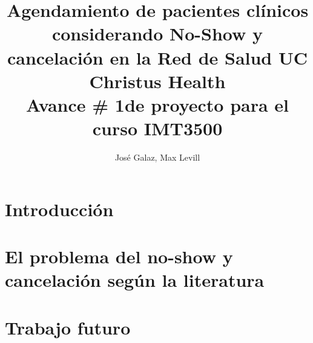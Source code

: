 \documentclass{article}
\title{Agendamiento de pacientes clínicos considerando No-Show y cancelación en la Red de Salud UC Christus Health \\ \vspace{0.5cm}\normalsize{Avance \# 1de proyecto para el curso IMT3500}}
\author{Jos\'e Galaz, Max Levill}
\begin{document}
  \maketitle
  \section{Introducci\'on }
    
  \section{El problema del no-show y cancelación según la literatura}
    
  \section{Trabajo futuro}
    

    {}
    
\end{document}
